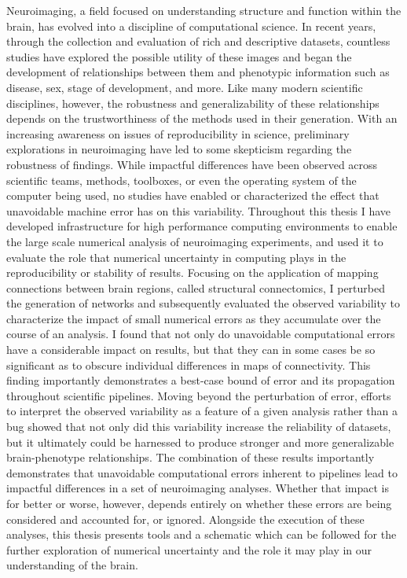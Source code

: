Neuroimaging, a field focused on understanding structure and function within the brain, has evolved into a
discipline of computational science. In recent years, through the collection and evaluation of rich and
descriptive datasets, countless studies have explored the possible utility of these images and began the
development of relationships between them and phenotypic information such as disease, sex, stage of development,
and more. Like many modern scientific disciplines, however, the robustness and generalizability of these
relationships depends on the trustworthiness of the methods used in their generation. With an increasing
awareness on issues of reproducibility in science, preliminary explorations in neuroimaging have led to some
skepticism regarding the robustness of findings. While impactful differences have been observed across
scientific teams, methods, toolboxes, or even the operating system of the computer being used, no studies
have enabled or characterized the effect that unavoidable machine error has on this variability. Throughout
this thesis I have developed infrastructure for high performance computing environments to enable the large
scale numerical analysis of neuroimaging experiments, and used it to evaluate the role that numerical
uncertainty in computing plays in the reproducibility or stability of results. Focusing on the application of
mapping connections between brain regions, called structural connectomics, I perturbed the generation of
networks and subsequently evaluated the observed variability to characterize the impact of small numerical
errors as they accumulate over the course of an analysis. I found that not only do unavoidable computational
errors have a considerable impact on results, but that they can in some cases be so significant as to obscure
individual differences in maps of connectivity. This finding importantly demonstrates a best-case bound of
error and its propagation throughout scientific pipelines. Moving beyond the perturbation of error, efforts to
interpret the observed variability as a feature of a given analysis rather than a bug showed that not only did
this variability increase the reliability of datasets, but it ultimately could be harnessed to produce stronger
and more generalizable brain-phenotype relationships. The combination of these results importantly demonstrates
that unavoidable computational errors inherent to pipelines lead to impactful differences in a set of
neuroimaging analyses. Whether that impact is for better or worse, however, depends entirely on whether these
errors are being considered and accounted for, or ignored. Alongside the execution of these analyses, this
thesis presents tools and a schematic which can be followed for the further exploration of numerical
uncertainty and the role it may play in our understanding of the brain.




